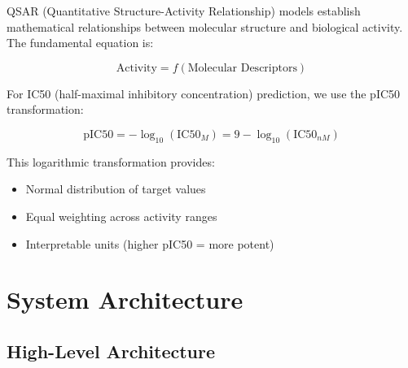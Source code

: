 \documentclass[11pt,a4paper]{article}
\begin{document}
QSAR (Quantitative Structure-Activity Relationship) models establish mathematical relationships between molecular structure and biological activity. The fundamental equation is:

\begin{equation}
    \text{Activity} = f(\text{Molecular Descriptors})
\end{equation}

For IC50 (half-maximal inhibitory concentration) prediction, we use the pIC50 transformation:

\begin{equation}
    \text{pIC50} = -\log_{10}(\text{IC50}_M) = 9 - \log_{10}(\text{IC50}_{nM})
\end{equation}

This logarithmic transformation provides:
\begin{itemize}
    \item Normal distribution of target values
    \item Equal weighting across activity ranges
    \item Interpretable units (higher pIC50 = more potent)
\end{itemize}

\section{System Architecture}

\subsection{High-Level Architecture}
\end{document}
